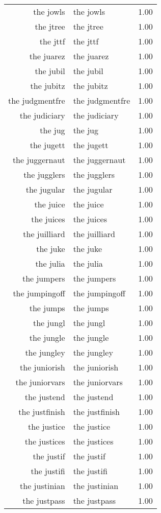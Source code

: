 \begin{table}[ht]
\begin{tabular}{rlr}
  the jowls & the jowls & 1.00 \\ 
  the jtree & the jtree & 1.00 \\ 
  the jttf & the jttf & 1.00 \\ 
  the juarez & the juarez & 1.00 \\ 
  the jubil & the jubil & 1.00 \\ 
  the jubitz & the jubitz & 1.00 \\ 
  the judgmentfre & the judgmentfre & 1.00 \\ 
  the judiciary & the judiciary & 1.00 \\ 
  the jug & the jug & 1.00 \\ 
  the jugett & the jugett & 1.00 \\ 
  the juggernaut & the juggernaut & 1.00 \\ 
  the jugglers & the jugglers & 1.00 \\ 
  the jugular & the jugular & 1.00 \\ 
  the juice & the juice & 1.00 \\ 
  the juices & the juices & 1.00 \\ 
  the juilliard & the juilliard & 1.00 \\ 
  the juke & the juke & 1.00 \\ 
  the julia & the julia & 1.00 \\ 
  the jumpers & the jumpers & 1.00 \\ 
  the jumpingoff & the jumpingoff & 1.00 \\ 
  the jumps & the jumps & 1.00 \\ 
  the jungl & the jungl & 1.00 \\ 
  the jungle & the jungle & 1.00 \\ 
  the jungley & the jungley & 1.00 \\ 
  the juniorish & the juniorish & 1.00 \\ 
  the juniorvars & the juniorvars & 1.00 \\ 
  the justend & the justend & 1.00 \\ 
  the justfinish & the justfinish & 1.00 \\ 
  the justice & the justice & 1.00 \\ 
  the justices & the justices & 1.00 \\ 
  the justif & the justif & 1.00 \\ 
  the justifi & the justifi & 1.00 \\ 
  the justinian & the justinian & 1.00 \\ 
  the justpass & the justpass & 1.00 \\ 

\end{tabular}
\end{table}
